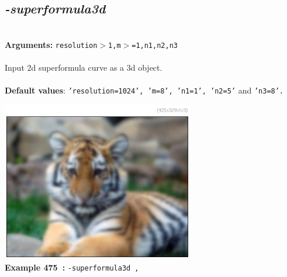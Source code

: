 \documentclass[a4paper,11pt,twoside]{book}
\begin{document}
\subsection{\emph{-superformula3d} }\vspace*{-0.5em}
~\\\textbf{Arguments: } 
{\small \texttt{resolution$>$1,m$>$=1,n1,n2,n3}}\\~\\
Input 2d superformula curve as a 3d object.
~\\~\\\textbf{Default values}: {\small \texttt{'resolution=1024', 'm=8', 'n1=1', 'n2=5'} and \texttt{'n3=8'.}}
\begin{center}\includegraphics[keepaspectratio=true,height=7cm,width=\textwidth]{img/gmic_def475.jpg}\\
{\footnotesize \textbf{Example 475~:} \texttt{-superformula3d ,}}
\end{center}
\end{document}
